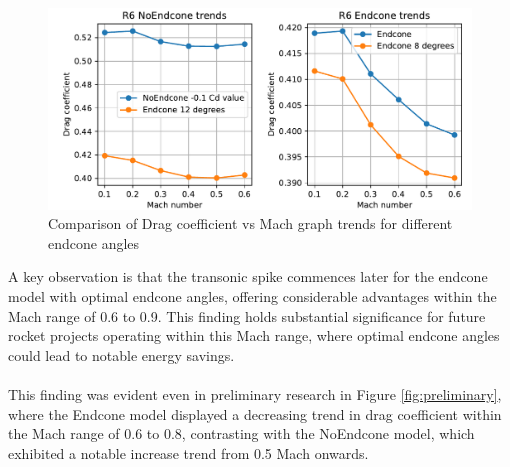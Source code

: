 \documentclass{article}
\begin{document}
\begin{figure}[H]
    \centering
    \includegraphics[width=\textwidth]{../data/R6-Parametric-Endcone/comparisone2plots.pdf}
    \caption{Comparison of Drag coefficient vs Mach graph trends for different endcone angles}
\end{figure}
\noindent A key observation is that the transonic spike commences later for the endcone 
model with optimal endcone angles, offering considerable advantages within the Mach range 
of 0.6 to 0.9. This finding holds substantial significance for future rocket projects operating 
within this Mach range, where optimal endcone angles could lead to notable energy savings.\\\\
This finding was evident even in preliminary research in Figure \ref{fig:preliminary}, where the Endcone model displayed a 
decreasing trend in drag coefficient within the Mach range of 0.6 to 0.8, contrasting with the 
NoEndcone model, which exhibited a notable increase trend from 0.5 Mach onwards.
\end{document}
